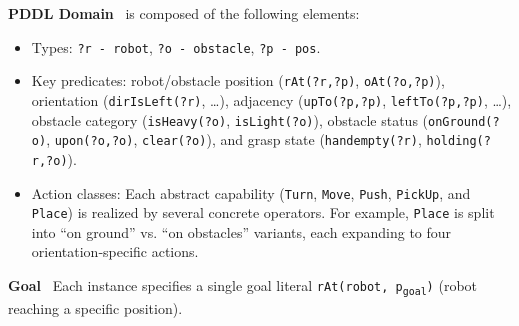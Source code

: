\documentclass[letterpaper, 10pt, journal, twoside]{IEEEtran}
\newcommand{\myparagraph}[1]{\noindent\textbf{#1}~}
\begin{document}
\myparagraph{PDDL Domain} is composed of the following elements:
\begin{itemize}
\item Types: \texttt{\small ?r - robot}, \texttt{\small ?o - obstacle}, \texttt{\small ?p - pos}.
\item Key predicates: robot/obstacle position (\texttt{\small rAt(?r,?p)}, \texttt{\small oAt(?o,?p)}), orientation (\texttt{\small dirIsLeft(?r)}, \dots), adjacency (\texttt{\small upTo(?p,?p)}, \texttt{\small leftTo(?p,?p)}, \dots), obstacle category (\texttt{\small isHeavy(?o)}, \texttt{\small isLight(?o)}), obstacle status (\texttt{\small onGround(?o)}, \texttt{\small upon(?o,?o)}, \texttt{\small clear(?o)}), and grasp state (\texttt{\small handempty(?r)}, \texttt{\small holding(?r,?o)}).
\item Action classes: Each abstract capability (\texttt{\small Turn}, \texttt{\small Move}, \texttt{\small Push}, \texttt{\small PickUp}, and \texttt{\small Place}) is realized by several concrete operators. For example, \texttt{\small Place} is split into ``on ground'' vs. ``on obstacles'' variants, each expanding to four orientation‑specific actions. 
\end{itemize}

\myparagraph{Goal}
Each instance specifies a single goal literal \texttt{rAt(robot, p\textsubscript{goal})} (robot reaching a specific position).
\end{document}
